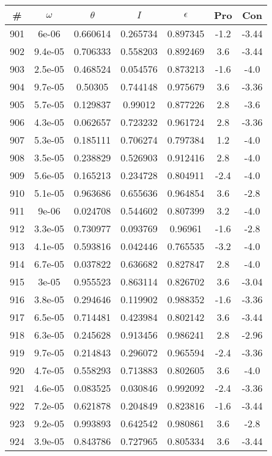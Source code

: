 \begin{table}
\begin{tabular}{c|c|c|c|c|c|c}
\# & $\omega$ & $\theta$ & $I$ & $\epsilon$ & Pro & Con\\
\hline
901 & 6e-06 & 0.660614 & 0.265734 & 0.897345 & -1.2 & -3.44\\
902 & 9.4e-05 & 0.706333 & 0.558203 & 0.892469 & 3.6 & -3.44\\
903 & 2.5e-05 & 0.468524 & 0.054576 & 0.873213 & -1.6 & -4.0\\
904 & 9.7e-05 & 0.50305 & 0.744148 & 0.975679 & 3.6 & -3.36\\
905 & 5.7e-05 & 0.129837 & 0.99012 & 0.877226 & 2.8 & -3.6\\
906 & 4.3e-05 & 0.062657 & 0.723232 & 0.961724 & 2.8 & -3.36\\
907 & 5.3e-05 & 0.185111 & 0.706274 & 0.797384 & 1.2 & -4.0\\
908 & 3.5e-05 & 0.238829 & 0.526903 & 0.912416 & 2.8 & -4.0\\
909 & 5.6e-05 & 0.165213 & 0.234728 & 0.804911 & -2.4 & -4.0\\
910 & 5.1e-05 & 0.963686 & 0.655636 & 0.964854 & 3.6 & -2.8\\
911 & 9e-06 & 0.024708 & 0.544602 & 0.807399 & 3.2 & -4.0\\
912 & 3.3e-05 & 0.730977 & 0.093769 & 0.96961 & -1.6 & -2.8\\
913 & 4.1e-05 & 0.593816 & 0.042446 & 0.765535 & -3.2 & -4.0\\
914 & 6.7e-05 & 0.037822 & 0.636682 & 0.827847 & 2.8 & -4.0\\
915 & 3e-05 & 0.955523 & 0.863114 & 0.826702 & 3.6 & -3.04\\
916 & 3.8e-05 & 0.294646 & 0.119902 & 0.988352 & -1.6 & -3.36\\
917 & 6.5e-05 & 0.714481 & 0.423984 & 0.802142 & 3.6 & -3.44\\
918 & 6.3e-05 & 0.245628 & 0.913456 & 0.986241 & 2.8 & -2.96\\
919 & 9.7e-05 & 0.214843 & 0.296072 & 0.965594 & -2.4 & -3.36\\
920 & 4.7e-05 & 0.558293 & 0.713883 & 0.802605 & 3.6 & -4.0\\
921 & 4.6e-05 & 0.083525 & 0.030846 & 0.992092 & -2.4 & -3.36\\
922 & 7.2e-05 & 0.621878 & 0.204849 & 0.823816 & -1.6 & -3.44\\
923 & 9.2e-05 & 0.993893 & 0.642542 & 0.980861 & 3.6 & -2.8\\
924 & 3.9e-05 & 0.843786 & 0.727965 & 0.805334 & 3.6 & -3.44\\

\end{tabular}
\end{table}
